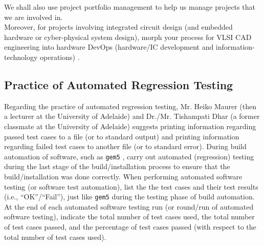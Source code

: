 \documentclass[letter,12pt]{article}
\begin{document}
We shall also use project portfolio management \cite{Rothman2016a,Rothman2009} to help us manage projects that we are involved in. \\

Moreover, for projects involving integrated circuit design (and embedded hardware or cyber-physical system design), morph your process for VLSI CAD engineering into hardware DevOps (hardware/IC development and information-technology operations) \cite{MythicIncStaff2018}.




















\subsection{Practice of Automated Regression Testing}
\label{ssec:PracticeOfAutomatedRegressionTesting}

Regarding the practice of automated regression testing, Mr. Heiko Maurer (then a lecturer at the University of Adelaide) and Dr./Mr. Tishampati Dhar (a former classmate at the University of Adelaide) suggests printing information regarding passed test cases to a file (or to standard output) and printing information regarding failed test cases to another file (or to standard error). During build automation of software, such as {\tt gem5} \cite{gem5developers2014,Binkert2011}, carry out automated (regression) testing during the last stage of the build/installation process to ensure that the build/installation was done correctly. When performing automated software testing (or software test automation), list the the test cases and their test results (i.e., ``OK''/``Fail''), just like {\tt gem5} during the testing phase of build automation. At the end of each automated software testing run (or round/run of automated software testing), indicate the total number of test cases used, the total number of test cases passed, and the percentage of test cases passed (with respect to the total number of test cases used).
\end{document}
